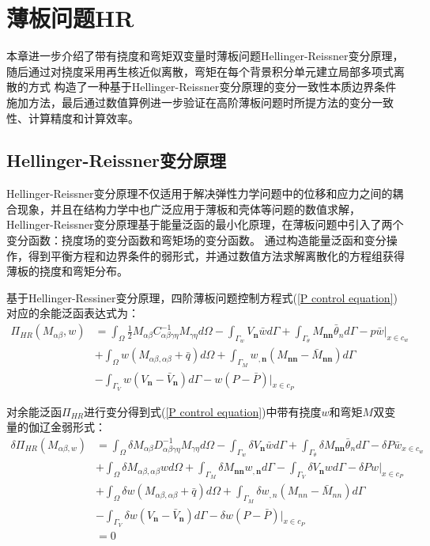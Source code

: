 \chapter{薄板问题HR}
本章进一步介绍了带有挠度和弯矩双变量时薄板问题Hellinger-Reissner变分原理，随后通过对挠度采用再生核近似离散，弯矩在每个背景积分单元建立局部多项式离散的方式
构造了一种基于Hellinger-Reissner变分原理的变分一致性本质边界条件施加方法，最后通过数值算例进一步验证在高阶薄板问题时所提方法的变分一致性、计算精度和计算效率。
\section{Hellinger-Reissner变分原理}
Hellinger-Reissner变分原理不仅适用于解决弹性力学问题中的位移和应力之间的耦合现象，并且在结构力学中也广泛应用于薄板和壳体等问题的数值求解，
Hellinger-Reissner变分原理基于能量泛函的最小化原理，在薄板问题中引入了两个变分函数：挠度场的变分函数和弯矩场的变分函数。
通过构造能量泛函和变分操作，得到平衡方程和边界条件的弱形式，并通过数值方法求解离散化的方程组获得薄板的挠度和弯矩分布。
\par
基于Hellinger-Ressiner变分原理\cite{}，四阶薄板问题控制方程式(\ref{P control equation})对应的余能泛函表达式为：
\begin{equation}\label{pfanhan}
\begin{split}
    \Pi_{H\!R}(M_{\alpha\beta},w)&=\int_{\Omega}\frac{1}{2}M_{\alpha\beta}C^{-1}_{\alpha\beta\gamma\eta}M_{\gamma\eta}d\Omega-\int_{\Gamma_w}V_{\pmb n}\bar{w}d\Gamma+\int_{\Gamma_{\theta}}M_{\pmb{nn}}\bar{\theta}_nd\Gamma-p\bar{w}\vert_{x\in{c_w}}\\
&+\int_{\Omega}w(M_{\alpha\beta,\alpha\beta}+\bar{q})d\Omega+\int_{\Gamma_M}w_{,\pmb n}(M_{\pmb{nn}}-\bar{M}_{\pmb{nn}})d\Gamma\\
&-\int_{\Gamma_V}w(V_{\pmb n}-\bar{V}_{\pmb n})d\Gamma-w(P-\bar{P})\vert_{x\in{c_P}}
\end{split}
\end{equation}\par
对余能泛函$\Pi_{H\!R}$进行变分得到式(\ref{P control equation})中带有挠度$w$和弯矩$M$双变量的伽辽金弱形式：
\newpage
\begin{equation}\label{Pweakfrom}
\begin{split}
    \delta\Pi_{H\!R}(M_{\alpha\beta,w})&=\int_{\Omega}\delta M_{\alpha\beta}D^{-1}_{\alpha\beta\gamma\eta}M_{\gamma\eta}d\Omega-\int_{\Gamma_w}\delta V_{\pmb n}\bar{w}d\Gamma+\int_{\Gamma_{\theta}}\delta M_{\pmb{nn}}\bar{\theta}_nd\Gamma-\delta P\bar{w}_{x\in{c_w}}\\
    &+\int_{\Omega}\delta M_{\alpha\beta,\alpha\beta}wd\Omega+\int_{\Gamma_M}\delta M_{\pmb{nn}}w_{,\pmb n}d\Gamma-\int_{\Gamma_V}\delta V_{\pmb n}wd\Gamma-\delta Pw\vert_{x\in{c_P}}\\
    &+\int_{\Omega}\delta w(M_{\alpha\beta,\alpha\beta}+\bar{q})d\Omega+\int_{\Gamma_M}\delta w_{,n}(M_{nn}-\bar{M}_{nn})d\Gamma\\
    &-\int_{\Gamma_V}\delta w(V_{\pmb n}-\bar{V}_{\pmb n})d\Gamma-\delta w(P-\bar{P})\vert_{x\in{c_P}}\\
    &=0
\end{split}
\end{equation}\par
